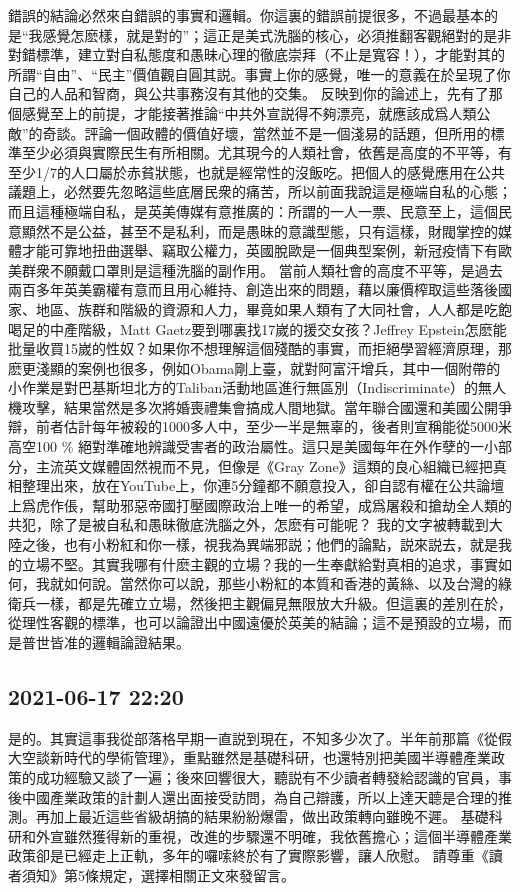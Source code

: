 \documentclass[twocolumn]{ctexart}
\begin{document}
錯誤的結論必然來自錯誤的事實和邏輯。你這裏的錯誤前提很多，不過最基本的是“我感覺怎麽樣，就是對的”；這正是美式洗腦的核心，必須推翻客觀絕對的是非對錯標準，建立對自私態度和愚昧心理的徹底崇拜（不止是寬容！），才能對其的所謂“自由”、“民主”價值觀自圓其説。事實上你的感覺，唯一的意義在於呈現了你自己的人品和智商，與公共事務沒有其他的交集。
反映到你的論述上，先有了那個感覺至上的前提，才能接著推論“中共外宣説得不夠漂亮，就應該成爲人類公敵”的奇談。評論一個政體的價值好壞，當然並不是一個淺易的話題，但所用的標準至少必須與實際民生有所相關。尤其現今的人類社會，依舊是高度的不平等，有至少1/7的人口屬於赤貧狀態，也就是經常性的沒飯吃。把個人的感覺應用在公共議題上，必然要先忽略這些底層民衆的痛苦，所以前面我說這是極端自私的心態；而且這種極端自私，是英美傳媒有意推廣的：所謂的一人一票、民意至上，這個民意顯然不是公益，甚至不是私利，而是愚昧的意識型態，只有這樣，財閥掌控的媒體才能可靠地扭曲選舉、竊取公權力，英國脫歐是一個典型案例，新冠疫情下有歐美群衆不願戴口罩則是這種洗腦的副作用。
當前人類社會的高度不平等，是過去兩百多年英美霸權有意而且用心維持、創造出來的問題，藉以廉價榨取這些落後國家、地區、族群和階級的資源和人力，畢竟如果人類有了大同社會，人人都是吃飽喝足的中產階級，Matt Gaetz要到哪裏找17嵗的援交女孩？Jeffrey Epstein怎麽能批量收買15嵗的性奴？如果你不想理解這個殘酷的事實，而拒絕學習經濟原理，那麽更淺顯的案例也很多，例如Obama剛上臺，就對阿富汗增兵，其中一個附帶的小作業是對巴基斯坦北方的Taliban活動地區進行無區別（Indiscriminate）的無人機攻擊，結果當然是多次將婚喪禮集會搞成人間地獄。當年聯合國還和美國公開爭辯，前者估計每年被殺的1000多人中，至少一半是無辜的，後者則宣稱能從5000米高空100 \% 絕對準確地辨識受害者的政治屬性。這只是美國每年在外作孽的一小部分，主流英文媒體固然視而不見，但像是《Gray Zone》這類的良心組織已經把真相整理出來，放在YouTube上，你連5分鐘都不願意投入，卻自認有權在公共論壇上爲虎作倀，幫助邪惡帝國打壓國際政治上唯一的希望，成爲屠殺和搶劫全人類的共犯，除了是被自私和愚昧徹底洗腦之外，怎麽有可能呢？
我的文字被轉載到大陸之後，也有小粉紅和你一樣，視我為異端邪説；他們的論點，説來説去，就是我的立場不堅。其實我哪有什麽主觀的立場？我的一生奉獻給對真相的追求，事實如何，我就如何說。當然你可以說，那些小粉紅的本質和香港的黃絲、以及台灣的綠衛兵一樣，都是先確立立場，然後把主觀偏見無限放大升級。但這裏的差別在於，從理性客觀的標準，也可以論證出中國遠優於英美的結論；這不是預設的立場，而是普世皆准的邏輯論證結果。
\subsection*{2021-06-17 22:20}

是的。其實這事我從部落格早期一直説到現在，不知多少次了。半年前那篇《從假大空談新時代的學術管理》，重點雖然是基礎科研，也還特別把美國半導體產業政策的成功經驗又談了一遍；後來回響很大，聽説有不少讀者轉發給認識的官員，事後中國產業政策的計劃人還出面接受訪問，為自己辯護，所以上達天聼是合理的推測。再加上最近這些省級胡搞的結果紛紛爆雷，做出政策轉向雖晚不遲。
基礎科研和外宣雖然獲得新的重視，改進的步驟還不明確，我依舊擔心；這個半導體產業政策卻是已經走上正軌，多年的囉嗦終於有了實際影響，讓人欣慰。
請尊重《讀者須知》第5條規定，選擇相關正文來發留言。
\end{document}

